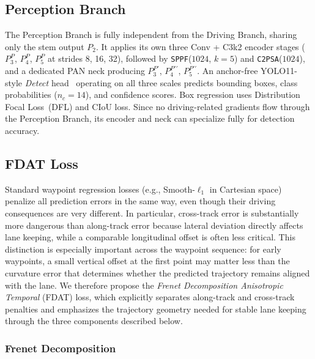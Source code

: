 \subsection{Perception Branch}

The Perception Branch is fully independent from the Driving Branch,
sharing only the stem output $P_2$.
It applies its own three Conv + C3k2 encoder stages
($P_3^P$, $P_4^P$, $P_5^P$ at strides 8, 16, 32), followed by
\texttt{SPPF}($1024$, $k{=}5$) and \texttt{C2PSA}($1024$), and
a dedicated PAN neck producing
$P_3^{P\prime}$, $P_4^{P\prime\prime}$, $P_5^{P\prime\prime}$.
An anchor-free YOLO11-style \emph{Detect} head~\cite{b_yolov11}
operating on all three scales predicts bounding boxes, class probabilities ($n_c{=}14$), and confidence scores. Box regression uses Distribution Focal Loss~(DFL) and CIoU loss.
Since no driving-related gradients flow through the Perception
Branch, its encoder and neck can specialize fully for detection
accuracy.

\subsection{FDAT Loss}

Standard waypoint regression losses (e.g., Smooth-$\ell_1$ in
Cartesian space) penalize all prediction errors in the same way,
even though their driving consequences are very different.
In particular, cross-track error is substantially more dangerous
than along-track error because lateral deviation directly affects
lane keeping, while a comparable longitudinal offset is often less
critical.
This distinction is especially important across the waypoint
sequence: for early waypoints, a small vertical offset at the first
point may matter less than the curvature error that determines
whether the predicted trajectory remains aligned with the lane.
We therefore propose the \emph{Frenet Decomposition Anisotropic
Temporal} (FDAT) loss, which explicitly separates along-track and
cross-track penalties and emphasizes the trajectory geometry needed
for stable lane keeping through the three components described
below.

\subsubsection{Frenet Decomposition}

